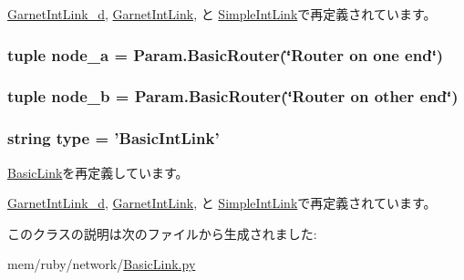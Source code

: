 \hyperlink{classGarnetLink__d_1_1GarnetIntLink__d_a17da7064bc5c518791f0c891eff05fda}{GarnetIntLink\_\-d}, \hyperlink{classGarnetLink_1_1GarnetIntLink_a17da7064bc5c518791f0c891eff05fda}{GarnetIntLink}, と \hyperlink{classSimpleLink_1_1SimpleIntLink_a17da7064bc5c518791f0c891eff05fda}{SimpleIntLink}で再定義されています。\hypertarget{classBasicLink_1_1BasicIntLink_ac6e1b551c7101b4055dd84baacf1366b}{
\subsubsection[{node\_\-a}]{\setlength{\rightskip}{0pt plus 5cm}tuple {\bf node\_\-a} = Param.BasicRouter(\char`\"{}Router on one end\char`\"{})}}
\label{classBasicLink_1_1BasicIntLink_ac6e1b551c7101b4055dd84baacf1366b}
\hypertarget{classBasicLink_1_1BasicIntLink_a889e9decbcff3aac7e218b6a38b0854b}{
\subsubsection[{node\_\-b}]{\setlength{\rightskip}{0pt plus 5cm}tuple {\bf node\_\-b} = Param.BasicRouter(\char`\"{}Router on other end\char`\"{})}}
\label{classBasicLink_1_1BasicIntLink_a889e9decbcff3aac7e218b6a38b0854b}
\hypertarget{classBasicLink_1_1BasicIntLink_acce15679d830831b0bbe8ebc2a60b2ca}{
\subsubsection[{type}]{\setlength{\rightskip}{0pt plus 5cm}string {\bf type} = '{\bf BasicIntLink}'}}
\label{classBasicLink_1_1BasicIntLink_acce15679d830831b0bbe8ebc2a60b2ca}


\hyperlink{classBasicLink_1_1BasicLink_acce15679d830831b0bbe8ebc2a60b2ca}{BasicLink}を再定義しています。

\hyperlink{classGarnetLink__d_1_1GarnetIntLink__d_acce15679d830831b0bbe8ebc2a60b2ca}{GarnetIntLink\_\-d}, \hyperlink{classGarnetLink_1_1GarnetIntLink_acce15679d830831b0bbe8ebc2a60b2ca}{GarnetIntLink}, と \hyperlink{classSimpleLink_1_1SimpleIntLink_acce15679d830831b0bbe8ebc2a60b2ca}{SimpleIntLink}で再定義されています。

このクラスの説明は次のファイルから生成されました:\begin{DoxyCompactItemize}
\item 
mem/ruby/network/\hyperlink{BasicLink_8py}{BasicLink.py}\end{DoxyCompactItemize}
